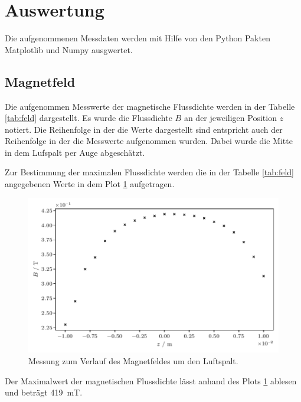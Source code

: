 \section{Auswertung}
\label{sec:auswertung}

Die aufgenommenen Messdaten werden mit Hilfe von den Python Pakten Matplotlib \cite{matplotlib} und Numpy \cite{numpy}
ausgwertet. 

\subsection{Magnetfeld}

Die aufgenommen Messwerte der magnetische Flussdichte werden in der Tabelle \ref{tab:feld} dargestellt.
Es wurde die Flussdichte $B$ an der jeweiligen Position $z$ notiert.
Die Reihenfolge in der die Werte dargestellt sind entspricht auch der Reihenfolge in der die Messwerte aufgenommen wurden.
Dabei wurde die Mitte in dem Lufspalt per Auge abgeschätzt.

\begin{table}[H]
	\centering
	\caption{}
	
	\label{tab:feld}
\end{table}

Zur Bestimmung der maximalen Flussdichte werden die in der Tabelle \ref{tab:feld} angegebenen Werte in dem 
Plot \ref{fig:feld} aufgetragen.

\begin{figure}[H]
    \centering
    \includegraphics{build/field.pdf}
    \caption{Messung zum Verlauf des Magnetfeldes um den Luftspalt.}
    \label{fig:feld}
\end{figure}

Der Maximalwert der magnetischen Flussdichte lässt anhand des Plots \ref{fig:feld} ablesen und beträgt
\qty{419}{\milli\tesla}.

